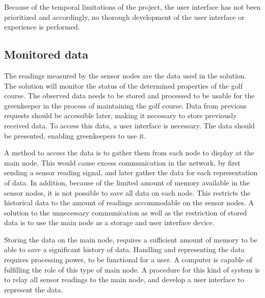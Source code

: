 
Because of the temporal limitations of the project, the user interface has not been prioritized and accordingly, no thorough development of the user interface or experience is performed. 


\subsection{Monitored data}
The readings measured by the sensor nodes are the data used in the solution. The solution will monitor the status of the determined properties of the golf course. The observed data needs to be stored and processed to be usable for the greenkeeper in the process of maintaining the golf course. Data from previous requests should be accessible later, making it necessary to store previously received data. To access this data, a user interface is necessary. The data should be presented, enabling greenkeepers to use it.%

A method to access the data is to gather them from each node to display at the main node. This would cause excess communication in the network, by first sending a sensor reading signal, and later gather the data for each representation of data. In addition, because of the limited amount of memory available in the sensor nodes, it is not possible to save all data on each node. This restricts the historical data to the amount of readings accommodable on the sensor nodes. A solution to the unnecessary communication as well as the restriction of stored data is to use the main node as a storage and user interface device.

Storing the data on the main node, requires a sufficient amount of memory to be able to save a significant history of data. Handling and representing the data requires processing power, to be functional for a user. A computer is capable of fulfilling the role of this type of main node. A procedure for this kind of system is to relay all sensor readings to the main node, and develop a user interface to represent the data. 

